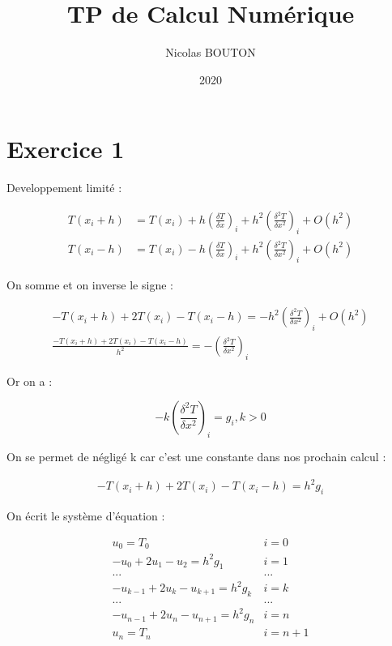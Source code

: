 \documentclass[11pt]{article}
\title{TP de Calcul Numérique}
\author{Nicolas BOUTON}
\date{2020}
\begin{document}
\maketitle

\section{Exercice 1}

Developpement limité : 

\begin{equation*}
  \begin{split}
    T(x_i + h) & = T(x_i) + h \left(\frac{\delta T}{\delta x} \right)_i + h^2 \left(\frac{\delta^2 T}{\delta x^2} \right)_i + O(h^2) \\
    T(x_i - h) & = T(x_i) - h \left(\frac{\delta T}{\delta x} \right)_i + h^2 \left(\frac{\delta^2 T}{\delta x^2} \right)_i + O(h^2)
  \end{split}
\end{equation*}

On somme et on inverse le signe :

\begin{equation*}
  \begin{split}
    - T(x_i + h) + 2 T(x_i) - T(x_i - h) = - h^2 \left(\frac{\delta^2 T}{\delta x^2} \right)_i + O(h^2) \\
    \frac{- T(x_i + h) + 2 T(x_i) - T(x_i - h)}{h^2} = - \left(\frac{\delta^2 T}{\delta x^2} \right)_i
  \end{split}
\end{equation*}

Or on a :

\begin{equation*}
  - k \left( \frac{\delta^2 T}{\delta x^2} \right)_i = g_i, k > 0
\end{equation*}

On se permet de négligé k car c'est une constante dans nos prochain calcul :

\begin{equation*}
  \begin{split}
    - T(x_i + h) + 2 T(x_i) - T(x_i - h) = h^2 g_i
  \end{split}
\end{equation*}

On écrit le système d'équation : 

\begin{equation*}
  \begin{array}{ll}
    u_0 = T_0 & i = 0 \\
    - u_0 + 2 u_1 - u_2 = h^2 g_1 & i = 1\\
    ... & ... \\
    - u_{k-1} + 2 u_k - u_{k+1} = h^2 g_k & i = k\\
    ... & ... \\
    - u_{n-1} + 2 u_n - u_{n+1} = h^2 g_n & i = n\\
    u_n = T_n & i = n + 1 \\
  \end{array}
\end{equation*}
\end{document}

